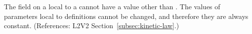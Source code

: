 The  field on a \Parameter local to a \KineticLaw cannot
have a value other than .  The values of parameters local to
\KineticLaw definitions cannot be changed, and therefore they are always
constant.  (References: L2V2 Section~\ref{subsec:kinetic-law}.)
